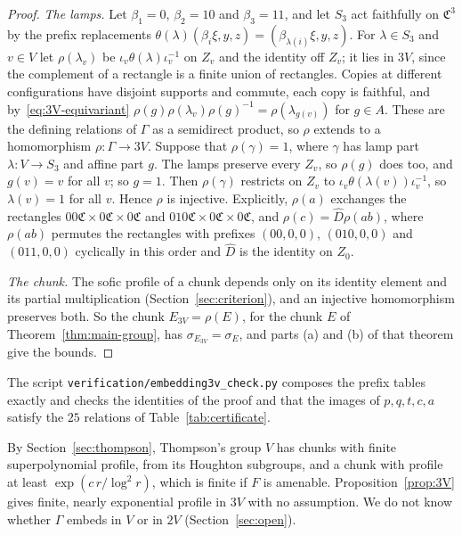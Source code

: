 \begin{proof}
\emph{The lamps.} Let $\beta_1=0$, $\beta_2=10$ and $\beta_3=11$, and let $S_3$ act faithfully on $\mathfrak C^3$ by the prefix replacements
$\theta(\lambda)(\beta_i\xi,y,z)=(\beta_{\lambda(i)}\xi,y,z)$. For $\lambda\in S_3$ and $v\in V$ let $\rho(\lambda_v)$ be $\iota_v\theta(\lambda)\iota_v^{-1}$ on
$Z_v$ and the identity off $Z_v$; it lies in $3V$, since the complement of a rectangle is a finite union of rectangles. Copies at different
configurations have disjoint supports and commute, each copy is faithful, and by~\eqref{eq:3V-equivariant}
$\rho(g)\rho(\lambda_v)\rho(g)^{-1}=\rho(\lambda_{g(v)})$ for $g\in A$. These are the defining relations of $\Gamma$ as a semidirect product, so $\rho$
extends to a homomorphism $\rho:\Gamma\to3V$. Suppose that $\rho(\gamma)=1$, where $\gamma$ has lamp part $\lambda:V\to S_3$ and affine part $g$. The
lamps preserve every $Z_v$, so $\rho(g)$ does too, and $g(v)=v$ for all $v$; so $g=1$. Then $\rho(\gamma)$ restricts on $Z_v$ to
$\iota_v\theta(\lambda(v))\iota_v^{-1}$, so $\lambda(v)=1$ for all $v$. Hence $\rho$ is injective. Explicitly, $\rho(a)$ exchanges the rectangles
$00\mathfrak C\times0\mathfrak C\times0\mathfrak C$ and $010\mathfrak C\times0\mathfrak C\times0\mathfrak C$, and $\rho(c)=\hat D\rho(ab)$, where $\rho(ab)$
permutes the rectangles with prefixes $(00,0,0)$, $(010,0,0)$ and $(011,0,0)$ cyclically in this order and $\hat D$ is the identity on $Z_0$.

\emph{The chunk.} The sofic profile of a chunk depends only on its identity element and its partial multiplication
(Section~\ref{sec:criterion}), and an injective homomorphism preserves both. So the chunk $E_{3V}=\rho(E)$, for the chunk $E$ of
Theorem~\ref{thm:main-group}, has $\sigma_{E_{3V}}=\sigma_E$, and parts (a) and (b) of that theorem give the bounds.
\end{proof}

The script \texttt{verification/embedding3v\_check.py} composes the prefix tables exactly and checks the identities of the proof and
that the images of $p,q,t,c,a$ satisfy the $25$ relations of Table~\ref{tab:certificate}.

By Section~\ref{sec:thompson}, Thompson's group $V$ has chunks with finite superpolynomial profile, from its Houghton subgroups, and a chunk with
profile at least $\exp(c\,r/\log^2r)$, which is finite if $F$ is amenable. Proposition~\ref{prop:3V} gives finite, nearly exponential profile in
$3V$ with no assumption. We do not know whether $\Gamma$ embeds in $V$ or in $2V$ (Section~\ref{sec:open}).

